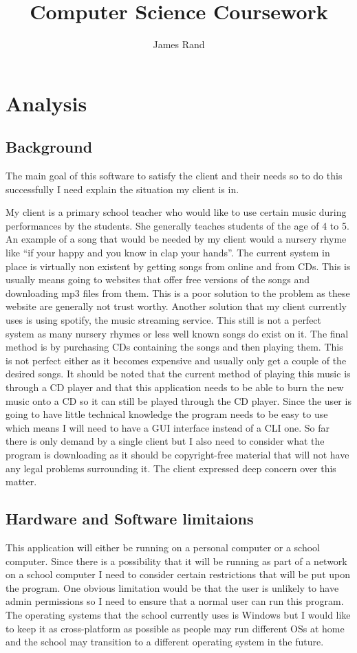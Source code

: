 \documentclass{article}
\title{Computer Science Coursework}
\date{}
\author{James Rand}
\begin{document}
\maketitle
\tableofcontents
\setcounter{tocdepth}{5}
\newpage
\section{Analysis}\label{analysis}
\subsection{Background}\label{background}
The main goal of this software to satisfy the client and their needs so
to do this successfully I need explain the situation my client
is in.

My client is a primary school teacher who would like to
use certain music during performances by the students. She generally teaches
students of the age of 4 to 5. An example of a
song that would be needed by my client would a nursery rhyme like ``if
your happy and you know in clap your hands''. The current system in
place is virtually non existent by getting songs from online
and from CDs. This is usually means
going to websites that offer free versions of the songs and downloading
mp3 files from them. This is a poor solution to the problem as these website
are generally not trust worthy. Another solution that my client
currently uses is using spotify, the music streaming service. This still
is not a perfect system as many nursery rhymes or less well known songs do
exist on it. The final method is by purchasing CDs containing the songs
and then playing them. This is not perfect either as it becomes expensive
and usually only get a couple of the desired songs.
It should be noted that the current method of playing this music
is through a CD player and that this application needs to be able to
burn the new music onto a CD so it can still be played through the CD
player.
Since the user is going to have little technical knowledge the program
needs to be easy to use which means I will need to have a GUI interface
instead of a CLI one. So far there is only demand by a single client but
I also need to consider what the program is downloading as it should be
copyright-free material that will not have any legal problems surrounding
it. The client expressed deep concern over this matter.

\subsection{Hardware and Software limitaions}\label{SoftwareAndHardware}
This application will either be running on a personal computer or a school computer.
Since there is a possibility that it will be running as part of a network on a school
computer I need to consider certain restrictions that will be put upon the program.
One obvious limitation would be that the user is unlikely to have admin permissions
so I need to ensure that a normal user can run this program. The operating systems
that the school currently uses is Windows but I would like to keep it as cross-platform
as possible as people may run different OSs at home and the school may transition to
a different operating system in the future.
\end{document}
